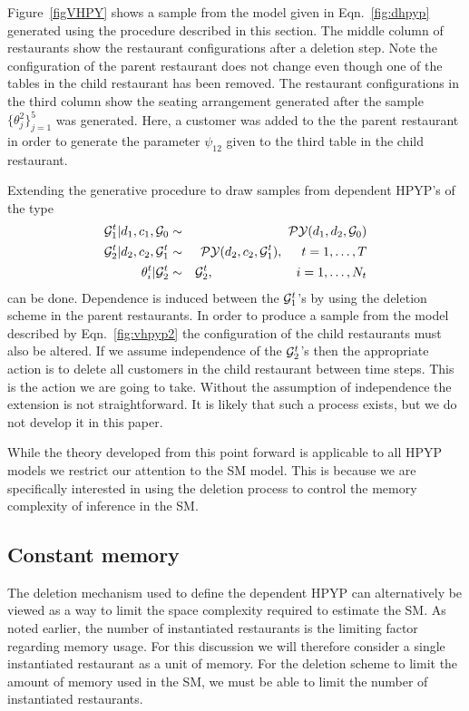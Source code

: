 Figure~\ref{figVHPY} shows a sample from the model given in Eqn.~\ref{fig:dhpyp} generated using the procedure described in this section. The middle column of restaurants show the restaurant configurations after a deletion step.  Note the configuration of the parent restaurant does not change even though one of the tables in the child restaurant has been removed.  The restaurant configurations in the third column show the seating arrangement  generated after the sample $\{ \theta_j^2 \}_{j = 1}^5$ was generated.  Here, a customer was added to the the parent restaurant in order to generate the parameter $\psi_{12}$  given to the third table in the child restaurant.

Extending the generative procedure to draw samples from dependent HPYP's of the type
%
\begin{eqnarray}
\G_1^t | d_1, c_1, \G_0  &\sim& \PY(d_1,d_2,\G_0)  \label{fig:vhpyp2}\\
\G_2^t | d_2, c_2, \G_1^t &\sim& \PY(d_2, c_2, \G_1^t),  \hspace{.5cm} t = 1,\dots, T \nonumber \\
\theta^t_i | \G_2^t &\sim& \G_2^t, \hspace{2.28cm} i = 1, \dots, N_t \nonumber
\end{eqnarray}
%
can be done. Dependence is induced between the $\G_1^t$'s by using the deletion scheme in the parent restaurants.  In order to produce a sample from the model described by Eqn.~\ref{fig:vhpyp2} the configuration of the child restaurants must also be altered.  If we assume independence of the $\G_2^t$'s then the appropriate action is to delete all customers in the child restaurant between time steps. This is the action we are going to take. Without the assumption of independence the extension is not straightforward. It is likely that such a process exists, but we do not develop it in this paper.

While the theory developed from this point forward is applicable to all HPYP models we restrict our attention to the SM model.  This is because we are specifically interested in using the deletion process to control the memory complexity of inference in the SM.

\subsection{Constant memory}
The deletion mechanism used to define the dependent HPYP can alternatively be viewed as a way to limit the space complexity required to estimate the SM.  As noted earlier, the number of instantiated restaurants is the limiting factor regarding memory usage.  For this discussion we will therefore consider a single instantiated restaurant as a unit of memory. For the deletion scheme to limit the amount of memory used in the SM, we must be able to limit the number of instantiated restaurants.

